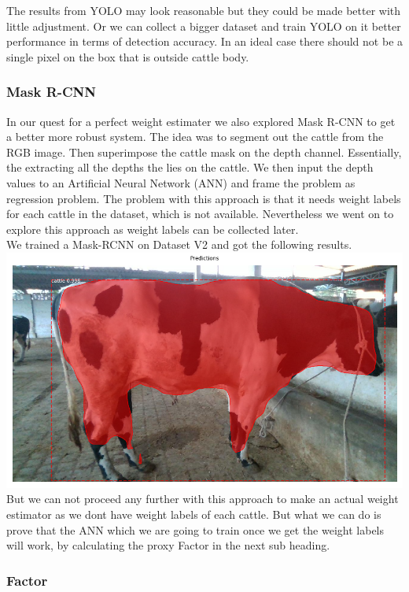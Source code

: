 The results from YOLO may look reasonable but they could be made better with little adjustment. Or we can collect a bigger dataset and train YOLO on it better performance in terms of detection accuracy. In an ideal case there should not be a single pixel on the box that is outside cattle body.

\subsubsection{Mask R-CNN}

In our quest for a perfect weight estimater we also explored Mask R-CNN to get a better more robust system. The idea was to segment out the cattle from the RGB image. Then superimpose the cattle mask on the depth channel. Essentially, the extracting all the depths the lies on the cattle. We then input the depth values to an Artificial Neural Network (ANN) and frame the problem as regression problem. The problem with this approach is that it needs weight labels for each cattle in the dataset, which is not available. Nevertheless we went on to explore this approach as weight labels can be collected later.\\

We trained a Mask-RCNN on Dataset V2 and got the following results.\\
\includegraphics[scale=0.3]{images/1122.png}\\


But we can not proceed any further with this approach to make an actual weight estimator as we dont have weight labels of each cattle. But what we can do is prove that the ANN which we are going to train once we get the weight labels will work, by calculating the proxy Factor in the next sub heading.

\subsubsection{Factor}


